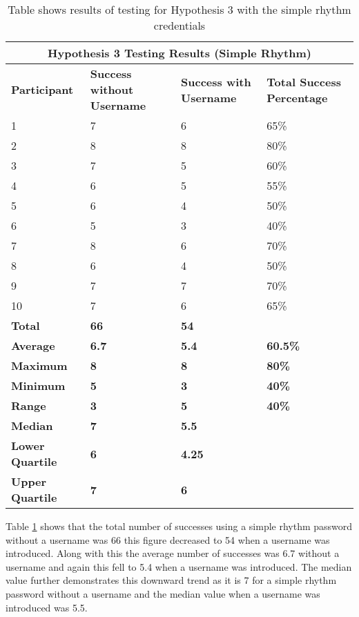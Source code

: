 \documentclass{article}
\begin{document}
{
\begin{table} [H]
\centering
\begin{tabular}{ |p{2cm}|p{4cm}|p{4cm}| p{4cm} | }
\hline
\multicolumn{4}{|c|}{\textbf{Hypothesis 3 Testing Results (Simple Rhythm)}} \\
\hline
\textbf{Participant} & \textbf{Success without Username} & \textbf{Success with Username} & \textbf{Total Success Percentage} \\
\hline
1 & 7 & 6 & 65\% \\
\hline
2 & 8 & 8 & 80\% \\
\hline
3 & 7 & 5 & 60\% \\
\hline
4 & 6 & 5 & 55\%  \\
\hline
5 & 6 & 4 & 50\% \\
\hline
6 & 5 & 3 & 40\% \\
\hline
7 & 8 & 6 & 70\% \\
\hline
8 & 6 & 4 & 50\% \\
\hline
9 & 7 & 7 & 70\% \\
\hline
10 & 7 & 6 & 65\% \\
\hline
\textbf{Total} & \textbf{66} & \textbf{54} & \\
\hline
\textbf{Average} & \textbf{6.7} & \textbf{5.4} & \textbf{60.5\%} \\
\hline
\textbf{Maximum} & \textbf{8} & \textbf{8} & \textbf{80\%} \\
\hline
\textbf{Minimum} & \textbf{5} & \textbf{3} & \textbf{40\%} \\
\hline
\textbf{Range} & \textbf{3} & \textbf{5} & \textbf{40\%} \\
\hline
\textbf{Median} & \textbf{7} & \textbf{5.5} & \\
\hline
\textbf{Lower Quartile} & \textbf{6} & \textbf{4.25} & \\
\hline
\textbf{Upper Quartile} & \textbf{7} & \textbf{6} & \\
\hline
\end{tabular}
\caption{Table shows results of testing for Hypothesis 3 with the simple rhythm credentials}
\label{table:3}
\end{table}
}

Table \ref{table:3} shows that the total number of successes using a simple rhythm password without a username was 66 this figure decreased to 54 when a username was introduced. Along with this the average number of successes was 6.7 without a username and again this fell to 5.4 when a username was introduced. The median value further demonstrates this downward trend as it is 7 for a simple rhythm password without a username and the median value when a username was introduced was 5.5.  \\
\end{document}
